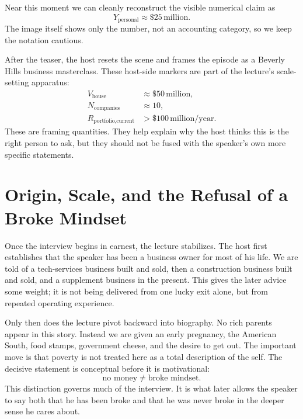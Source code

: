 Near this moment we can cleanly reconstruct the visible numerical claim as
\begin{equation}
Y_{\text{personal}} \approx \$25\,\text{million}.
\end{equation}
The image itself shows only the number, not an accounting category, so we keep the notation cautious.

After the teaser, the host resets the scene and frames the episode as a Beverly Hills business masterclass. These host-side markers are part of the lecture's scale-setting apparatus:
\begin{align}
V_{\text{house}} &\approx \$50\,\text{million}, \\
N_{\text{companies}} &\approx 10, \\
R_{\text{portfolio,current}} &> \$100\,\text{million}/\text{year}.
\end{align}
These are framing quantities. They help explain why the host thinks this is the right person to ask, but they should not be fused with the speaker's own more specific statements.

\section{Origin, Scale, and the Refusal of a Broke Mindset}

Once the interview begins in earnest, the lecture stabilizes. The host first establishes that the speaker has been a business owner for most of his life. We are told of a tech-services business built and sold, then a construction business built and sold, and a supplement business in the present. This gives the later advice some weight; it is not being delivered from one lucky exit alone, but from repeated operating experience.

Only then does the lecture pivot backward into biography. No rich parents appear in this story. Instead we are given an early pregnancy, the American South, food stamps, government cheese, and the desire to get out. The important move is that poverty is not treated here as a total description of the self. The decisive statement is conceptual before it is motivational:
\begin{equation}
\text{no money} \neq \text{broke mindset}.
\end{equation}
This distinction governs much of the interview. It is what later allows the speaker to say both that he has been broke and that he was never broke in the deeper sense he cares about.

